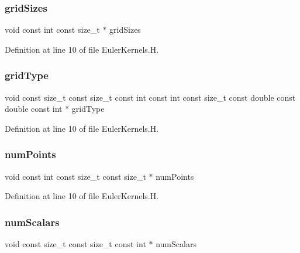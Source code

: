 \subsubsection{\texorpdfstring{grid\+Sizes}{gridSizes}}
{\footnotesize\ttfamily void const int const size\+\_\+t $\ast$ grid\+Sizes}



Definition at line 10 of file Euler\+Kernels.\+H.

\hypertarget{EulerKernels_8H_af99bcb504c360b791c023e906710851c}{}\label{EulerKernels_8H_af99bcb504c360b791c023e906710851c} 
\subsubsection{\texorpdfstring{grid\+Type}{gridType}}
{\footnotesize\ttfamily void const size\+\_\+t const size\+\_\+t const int const int const size\+\_\+t const double const double const int $\ast$ grid\+Type}



Definition at line 10 of file Euler\+Kernels.\+H.

\hypertarget{EulerKernels_8H_a26ea64bf27e81d41692232b2b97160c3}{}\label{EulerKernels_8H_a26ea64bf27e81d41692232b2b97160c3} 
\subsubsection{\texorpdfstring{num\+Points}{numPoints}}
{\footnotesize\ttfamily void const int const size\+\_\+t const size\+\_\+t $\ast$ num\+Points}



Definition at line 10 of file Euler\+Kernels.\+H.

\hypertarget{EulerKernels_8H_a603fc2ed96fba20942f7b4dc59fa93bf}{}\label{EulerKernels_8H_a603fc2ed96fba20942f7b4dc59fa93bf} 
\subsubsection{\texorpdfstring{num\+Scalars}{numScalars}}
{\footnotesize\ttfamily void const size\+\_\+t const size\+\_\+t const int $\ast$ num\+Scalars}



